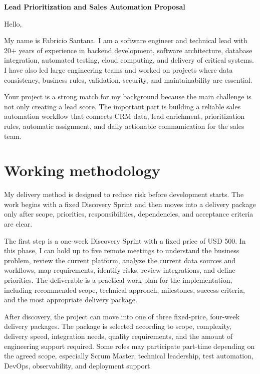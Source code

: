 \documentclass[11pt,a4paper]{article}
\begin{document}
\begin{center}
{\LARGE\bfseries Lead Prioritization and Sales Automation Proposal}
\end{center}
\vspace{0.5em}

Hello,\par

My name is Fabricio Santana. I am a software engineer and technical lead with 20+ years of experience in backend development, software architecture, database integration, automated testing, cloud computing, and delivery of critical systems. I have also led large engineering teams and worked on projects where data consistency, business rules, validation, security, and maintainability are essential.\par

Your project is a strong match for my background because the main challenge is not only creating a lead score. The important part is building a reliable sales automation workflow that connects CRM data, lead enrichment, prioritization rules, automatic assignment, and daily actionable communication for the sales team.\par

\section*{Working methodology}

My delivery method is designed to reduce risk before development starts. The work begins with a fixed Discovery Sprint and then moves into a delivery package only after scope, priorities, responsibilities, dependencies, and acceptance criteria are clear.\par

The first step is a one-week Discovery Sprint with a fixed price of USD 500. In this phase, I can hold up to five remote meetings to understand the business problem, review the current platform, analyze the current data sources and workflows, map requirements, identify risks, review integrations, and define priorities. The deliverable is a practical work plan for the implementation, including recommended scope, technical approach, milestones, success criteria, and the most appropriate delivery package.\par

After discovery, the project can move into one of three fixed-price, four-week delivery packages. The package is selected according to scope, complexity, delivery speed, integration needs, quality requirements, and the amount of engineering support required. Some roles may participate part-time depending on the agreed scope, especially Scrum Master, technical leadership, test automation, DevOps, observability, and deployment support.\par
\end{document}
